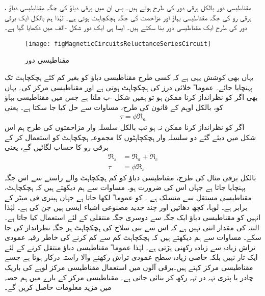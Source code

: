 مقناطیسی دور بالکل برقی دور کی طرح ہوتے ہیں۔ بس ان میں برقی دباؤ  کی جگہ مقناطیسی دباؤ  ، برقی رو   کی جگہ مقناطیسی بہاؤ   اور مزاحمت  کی جگہ  ہچکچاہٹ   ہوتی ہے۔ لہٰذا ہم بالکل ایک برقی دور کی طرح ایک مقناطیسی دور بنا سکتے ہیں۔ ایسا ہی ایک دور شکل -الف میں دکھایا گیا ہے۔
\begin{figure}
\centering
\texttt{[image: figMagneticCircuitsReluctanceSeriesCircuit]}
\caption{مقناطیسی دور}
\label{شکل_مقناطیسی__مقناطیسی_سلسلہ_وار_دور}
\end{figure}
%
یہاں بھی کوشش یہی ہے کہ کسی طرح مقناطیسی دباؤ  کو بغیر کم کئے ہچکچاہٹ  تک پہنچایا جائے۔ عموما ً  خلائی درز کی ہچکچاہٹ ہوتی ہے اور  مقناطیسی مرکز کی۔ یہاں بھی اگر  کو نظرانداز کرنا ممکن ہو تو ہمیں شکل -ب ملتا ہے جس میں مقناطیسی بہاؤ  کو، بالکل اوہم کے قانون کی طرح، مساوات سے حل کیا جا سکتا ہے۔ یعنی
\begin{align}
\tau=\phi \Re_a
\end{align}
 اگر  کو نظرانداز کرنا ممکن نہ ہو تب بالکل سلسلہ وار مزاحمتوں کی طرح ہم اس شکل میں دیئے گئے دو سلسلہ وار ہچکچاہٹوں کا مجموعہ ہچکچاہٹ   کو استعمال کر کے برقی رو کا حساب لگائیں گے، یعنی
\begin{align}
\Re_s&=\Re_a+\Re_c\\
\tau&=\phi \Re_s \label{مساوات_مقناطیسی_دور_مقناطیسی_اوہم_قانون}
\end{align}
	بالکل برقی مثال کی طرح، مقناطیسی دباؤ کو کم ہچکچاہٹ والے راستے سے اس جگہ پہنچایا جاتا ہے جہاں اس کی ضرورت ہو۔ مساوات   سے ہم دیکھتے ہیں کہ ہچکچاہٹ،  مقناطیسی مستقل  سے منسلک ہے ۔ کو عموما ً  لکھا جاتا ہے جہاں   ہینری فی میٹر  کے برابر ہے۔ لوہا،  کچھ دھاتیں اور چند جدید مصنوعی اشیاء  ایسی ہیں جن کی  ہے۔ لہٰذا انہیں کو مقناطیسی دباؤ  ایک جگہ سے دوسری جگہ منتقلی کے لئے استعمال کیا جاتا ہے۔ البتہ  کی مقدار اتنی نہیں ہے کہ اس سے بنی سلاخ کی ہچکچاہٹ ہر جگہ نظرانداز کی جا سکے۔ مساوات   سے ہم دیکھتے ہیں کہ ہچکچاہٹ کم سے کم کرنے کی خاطر رقبہ عمودی تراش زیادہ سے زیادہ رکھنی پڑتی ہے۔ لہٰذا عموما ً مقناطیسی دباؤ منتقل کرنے کے لئے ایک تار نہیں بلکہ خاصی زیادہ سطح عمودی تراش رکھنے والا راستہ  درکار ہوتا ہے جسے مقناطیسی مرکز کہتے ہیں۔برقی آلوں میں استعمال  مقناطیسی مرکز لوہے کی باریک چادر یا پتری  تہہ  در تہہ رکھ کر بنائی جاتی ہے۔ مقناطیسی مرکز کے بارے میں ہم حصہ   میں مزید معلومات حاصل کریں گے۔

